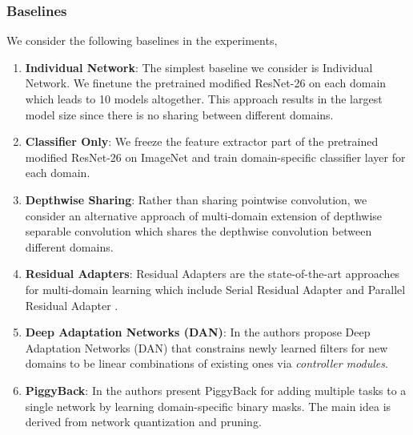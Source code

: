 \documentclass[letterpaper]{article} \usepackage{aaai19}  \usepackage{times}  \usepackage{helvet}  \usepackage{courier}  \usepackage{url}  \usepackage{graphicx}  \usepackage{amssymb}
\begin{document}
\subsubsection{Baselines}
We consider the following baselines in the experiments,
\begin{enumerate}[label=\textbf{(\alph*)}]
\item \textbf{Individual Network}: The simplest baseline we consider is Individual Network. We finetune the pretrained modified ResNet-26 on each domain which leads to 10 models altogether. This approach results in the largest model size since there is no sharing between different domains.

\item \textbf{Classifier Only}: We freeze the feature extractor part of the pretrained modified ResNet-26 on ImageNet and train domain-specific classifier layer for each domain.

\item \textbf{Depthwise Sharing}: Rather than sharing pointwise convolution, we consider an alternative approach of multi-domain extension of depthwise separable convolution which shares the depthwise convolution between different domains. 

\item \textbf{Residual Adapters}: Residual Adapters \cite{rebuffi2017learning,rebuffi18efficient} are the state-of-the-art approaches for multi-domain learning which include Serial Residual Adapter \cite{rebuffi2017learning} and Parallel Residual Adapter \cite{rebuffi18efficient}. 

\item \textbf{Deep Adaptation Networks (DAN)}: In \cite{rosenfeld2017incremental} the authors propose Deep Adaptation Networks (DAN) that constrains newly learned filters for new domains to be linear combinations of existing ones via \textit{controller modules}.

\item \textbf{PiggyBack}: In \cite{mallya2018piggyback} the authors present PiggyBack for adding multiple tasks to a single network by learning domain-specific binary masks. The main idea is derived from network quantization \cite{courbariaux2016binarized,guo2018survey} and pruning. 

\end{enumerate}
\end{document}
